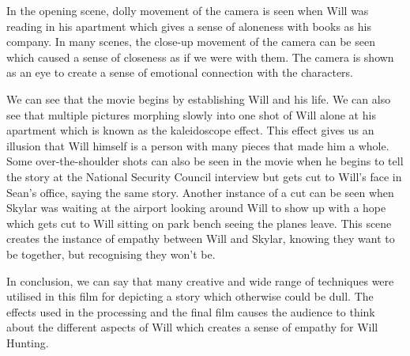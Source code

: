 \documentclass[10pt]{article}
\begin{document}
\par
In the opening scene, dolly movement of the camera is seen when Will was reading in his apartment which gives a sense of aloneness with books as his company. In many scenes, the close-up movement of the camera can be seen which caused a sense of closeness as if we were with them. The camera is shown as an eye to create a sense of emotional connection with the characters.\\
\par
We can see that the movie begins by establishing Will and his life. We can also see that multiple pictures morphing slowly into one shot of Will alone at his apartment which is known as the kaleidoscope effect. This effect gives us an illusion that Will himself is a person with many pieces that made him a whole. Some over-the-shoulder shots can also be seen in the movie when he begins to tell the story at the National Security Council interview but gets cut to Will's face in Sean's office, saying the same story. Another instance of a cut can be seen when Skylar was waiting at the airport looking around Will to show up with a hope which gets cut to Will sitting on park bench seeing the planes leave. This scene creates the instance of empathy between Will and Skylar, knowing they want to be together, but recognising they won't be.\\
\par
In conclusion, we can say that many creative and wide range of techniques were utilised in this film for depicting a story which otherwise could be dull. The effects used in the processing and the final film causes the audience to think about the different aspects of Will which creates a sense of empathy for Will Hunting.
\end{document}
